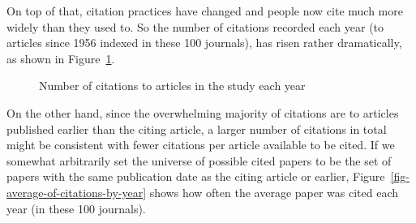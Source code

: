 \documentclass[
  10pt,
  letterpaper,
  DIV=11,
  numbers=noendperiod,
  twoside]{scrartcl}
\begin{document}
On top of that, citation practices have changed and people now cite much
more widely than they used to. So the number of citations recorded each
year (to articles since 1956 indexed in these 100 journals), has risen
rather dramatically, as shown in
Figure~\ref{fig-number-of-citations-by-year}.

\begin{figure}


\caption{\label{fig-number-of-citations-by-year}Number of citations to
articles in the study each year}

\end{figure}%

On the other hand, since the overwhelming majority of citations are to
articles published earlier than the citing article, a larger number of
citations in total might be consistent with fewer citations per article
available to be cited. If we somewhat arbitrarily set the universe of
possible cited papers to be the set of papers with the same publication
date as the citing article or earlier,
Figure~\ref{fig-average-of-citations-by-year} shows how often the
average paper was cited each year (in these 100 journals).
\end{document}
